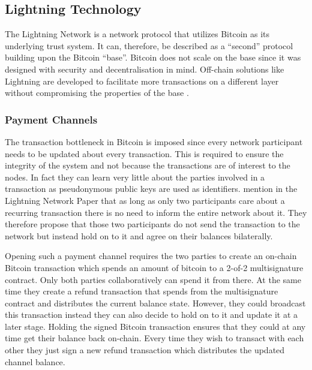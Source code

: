 \documentclass[final]{fhnwreport}       %
\begin{document}
\subsection{Lightning Technology}
The Lightning Network is a network protocol that utilizes Bitcoin as its underlying trust system. It can, therefore, be described as a ``\gls{second}'' protocol building upon the Bitcoin ``\gls{base}''. Bitcoin does not scale on the \gls{base} since it was designed with security and decentralisation in mind. Off-chain solutions like Lightning are developed to facilitate more transactions on a different layer without compromising the properties of the \gls{base} \citep{poon_bitcoin_2016}.

\subsubsection{Payment Channels}
The transaction bottleneck in Bitcoin is imposed since every network participant needs to be updated about every transaction. This is required to ensure the integrity of the system and not because the transactions are of interest to the nodes. In fact they can learn very little about the parties involved in a transaction as \gls{pseudonymous} public keys are used as identifiers. \textcite{poon_bitcoin_2016} mention in the Lightning Network Paper that as long as only two participants care about a recurring transaction there is no need to inform the entire network about it. They therefore propose that those two participants do not send the transaction to the network but instead hold on to it and agree on their balances bilaterally. 

Opening such a payment channel requires the two parties to create an on-chain Bitcoin transaction which spends an amount of bitcoin to a 2-of-2 multisignature contract. Only both parties collaboratively can spend it from there. At the same time they create a refund transaction that spends from the multisignature contract and distributes the current balance state. However, they could broadcast this transaction instead they can also decide to hold on to it and update it at a later stage. Holding the signed Bitcoin transaction ensures that they could at any time get their balance back on-chain. Every time they wish to transact with each other they just sign a new refund transaction which distributes the updated channel balance.
\end{document}
